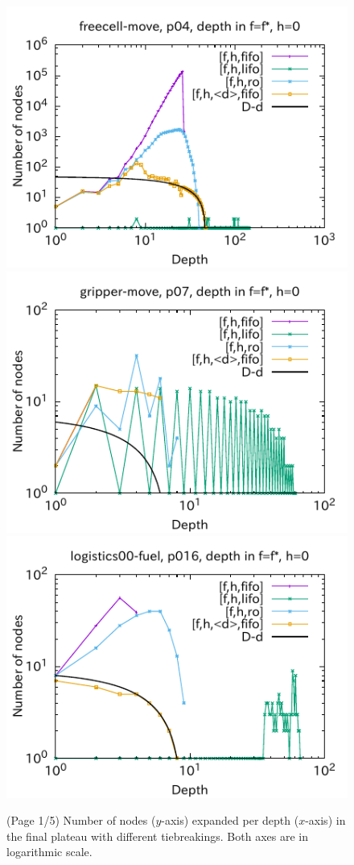 \begin{figure}[htbp]
\includegraphics{img/output-lmcut/freecell-move/p04-0.pdf}
\includegraphics{img/output-lmcut/gripper-move/p07-0.pdf}
\includegraphics{img/output-lmcut/logistics00-fuel/p016-0.pdf}
 \caption{(Page 1/5) Number of nodes ($y$-axis) expanded per depth ($x$-axis) in
 the final plateau with different tiebreakings. Both axes are in logarithmic scale.
 }
 \label{fig:depth-histogram}
\end{figure}

